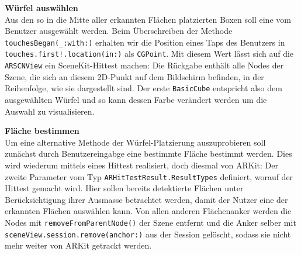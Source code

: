 \begin{description}
	\textbf{Würfel auswählen}\\
	Aus den so in die Mitte aller erkannten Flächen platzierten Boxen soll eine vom Benutzer ausgewählt werden. Beim Überschreiben der Methode \texttt{touchesBegan(\_:with:)} erhalten wir die Position eines Taps des Benutzers in \texttt{touches.first!.location(in:)} als \texttt{CGPoint}. Mit diesem Wert lässt sich auf die \texttt{ARSCNView} ein SceneKit-Hittest machen:
	Die Rückgabe enthält alle Nodes der Szene, die sich an diesem 2D-Punkt auf dem Bildschirm befinden, in der Reihenfolge, wie sie dargestellt sind. Der erste \texttt{BasicCube} entspricht also dem ausgewählten Würfel und so kann dessen Farbe verändert werden um die Auswahl zu visualisieren.

	\textbf{Fläche bestimmen}\\
	Um eine alternative Methode der Würfel-Platzierung auszuprobieren soll zunächst durch Benutzereingabge eine bestimmte Fläche bestimmt werden. Dies wird wiederum mittels eines Hittest realisiert, doch diesmal von ARKit:
	Der zweite Parameter vom Typ \texttt{ARHitTestResult.ResultTypes} definiert, worauf der Hittest gemacht wird. Hier sollen bereits detektierte Flächen unter Berücksichtigung ihrer Ausmasse betrachtet werden, damit der Nutzer eine der erkannten Flächen auswählen kann. Von allen anderen Flächenanker werden die Nodes mit \texttt{removeFromParentNode()} der Szene entfernt und die Anker selber mit \texttt{sceneView.session.remove(anchor:)} aus der Session gelöscht, sodass sie nicht mehr weiter von ARKit getrackt werden.


\end{description}
